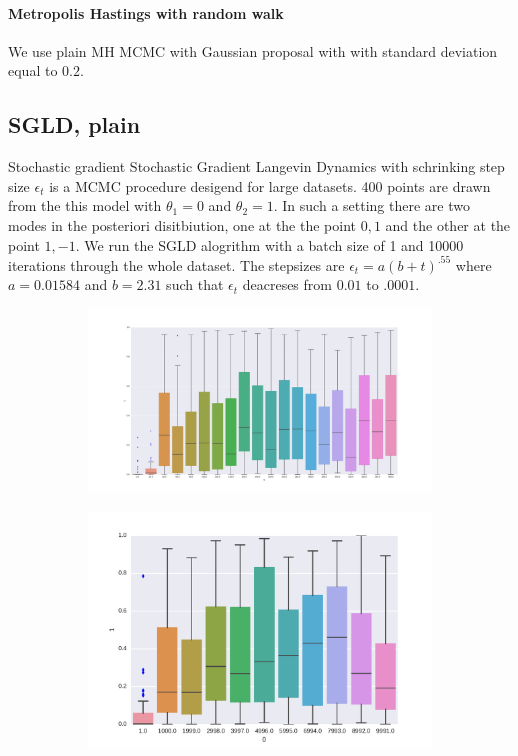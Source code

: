 \documentclass{article}
\begin{document}
\paragraph{Metropolis Hastings with random walk}
We use plain MH MCMC with Gaussian proposal with with standard deviation equal to  $0.2$.   

\subsection{SGLD, plain }
Stochastic gradient  Stochastic Gradient Langevin Dynamics  with schrinking step size $\epsilon_t$ is a MCMC procedure desigend for large datasets. 
400 points are drawn from the this model with $\theta_1 = 0$ and $\theta_2= 1$. In such a setting there are two modes in the posteriori disitbiution, one at the the point $0,1$ and the other at the point $1,-1$. We run the SGLD alogrithm with a batch size of 1 and 10000 iterations through the whole dataset. The stepsizes are $\epsilon_t = a(b+t)^{.55}$ where $ a = 0.01584$ and $b=2.31$ such that $\epsilon_t$ deacreses from $0.01$ to $.
0001$. 


\begin{figure}
\begin{subfigure}{.5\textwidth}
\includegraphics[width=\textwidth]{./img/mcmc_mixing.pdf}
\end{subfigure}%
\begin{subfigure}{.5\textwidth}
\includegraphics[width=\textwidth]{./img/sgld_mixing.pdf}
\end{subfigure}%
\end{figure}
\end{document}
